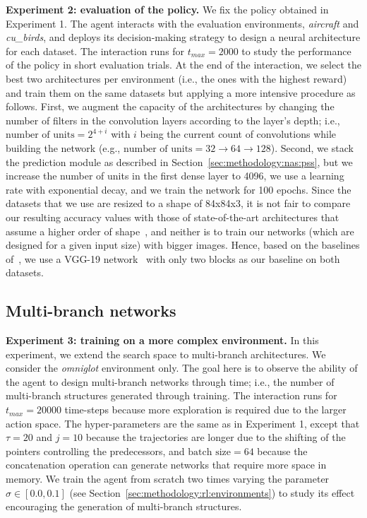 
\textbf{Experiment 2: evaluation of the policy.} We fix the policy obtained in Experiment 1. The agent interacts with the evaluation environments, \textit{aircraft} and \textit{cu\_birds}, and deploys its decision-making strategy to design a neural architecture for each dataset. The interaction runs for $t_{max}=2000$ to study the performance of the policy in short evaluation trials. At the end of the interaction, we select the best two architectures per environment (i.e., the ones with the highest reward) and train them on the same datasets but applying a more intensive procedure as follows. First, we augment the capacity of the architectures by changing the number of filters in the convolution layers according to the layer's depth; i.e., $\text{number of units}=2^{4+i}$ with $i$ being the current count of convolutions while building the network  (e.g., $\text{number of units}=32 \rightarrow 64 \rightarrow 128$). Second, we stack the prediction module as described in Section~\ref{sec:methodology:nas:pss}, but we increase the number of units in the first dense layer to 4096, we use a learning rate with exponential decay, and we train the network for 100 epochs. Since the datasets that we use are resized to a shape of 84x84x3, it is not fair to compare our resulting accuracy values with those of state-of-the-art architectures that assume a higher order of shape~\citep{FineGrained2, FineGrained3, FineGrainedResults}, and neither is to train our networks (which are designed for a given input size) with bigger images. Hence, based on the baselines of~\citet{FineGrainedResults}, we use a VGG-19 network~\citep{VGGPaper} with only two blocks as our baseline on both datasets.


\subsection{Multi-branch networks} \label{sec:experiments:multibranch}


\textbf{Experiment 3: training on a more complex environment.} In this experiment, we extend the search space to multi-branch architectures. We consider the \textit{omniglot} environment only. The goal here is to observe the ability of the agent to design multi-branch networks through time; i.e., the number of multi-branch structures generated through training. The interaction runs for $t_{max}=20000$ time-steps because more exploration is required due to the larger action space. The hyper-parameters are the same as in Experiment 1, except that $\tau=20$ and $j=10$ because the trajectories are longer due to the shifting of the pointers controlling the predecessors, and $\text{batch size}=64$ because the concatenation operation can generate networks that require more space in memory. We train the agent from scratch two times varying the parameter $\sigma \in [0.0, 0.1]$ (see Section~\ref{sec:methodology:rl:environments}) to study its effect encouraging the generation of multi-branch structures.
